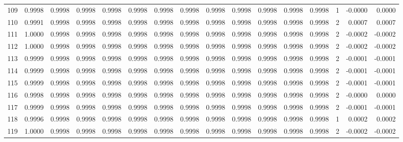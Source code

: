 \begin{tabular}{lrrrrrrrrrrrrrrr}
109 &      0.9998 &  0.9998 &  0.9998 &  0.9998 &  0.9998 &  0.9998 &  0.9998 &  0.9998 &  0.9998 &  0.9998 &   0.9998 &     0.9998 &      1 &                   -0.0000 &                     0.0000 \\
110 &      0.9991 &  0.9998 &  0.9998 &  0.9998 &  0.9998 &  0.9998 &  0.9998 &  0.9998 &  0.9998 &  0.9998 &   0.9998 &     0.9998 &      2 &                    0.0007 &                     0.0007 \\
111 &      1.0000 &  0.9998 &  0.9998 &  0.9998 &  0.9998 &  0.9998 &  0.9998 &  0.9998 &  0.9998 &  0.9998 &   0.9998 &     0.9998 &      2 &                   -0.0002 &                    -0.0002 \\
112 &      1.0000 &  0.9998 &  0.9998 &  0.9998 &  0.9998 &  0.9998 &  0.9998 &  0.9998 &  0.9998 &  0.9998 &   0.9998 &     0.9998 &      2 &                   -0.0002 &                    -0.0002 \\
113 &      0.9999 &  0.9998 &  0.9998 &  0.9998 &  0.9998 &  0.9998 &  0.9998 &  0.9998 &  0.9998 &  0.9998 &   0.9998 &     0.9998 &      2 &                   -0.0001 &                    -0.0001 \\
114 &      0.9999 &  0.9998 &  0.9998 &  0.9998 &  0.9998 &  0.9998 &  0.9998 &  0.9998 &  0.9998 &  0.9998 &   0.9998 &     0.9998 &      2 &                   -0.0001 &                    -0.0001 \\
115 &      0.9999 &  0.9998 &  0.9998 &  0.9998 &  0.9998 &  0.9998 &  0.9998 &  0.9998 &  0.9998 &  0.9998 &   0.9998 &     0.9998 &      2 &                   -0.0001 &                    -0.0001 \\
116 &      0.9998 &  0.9998 &  0.9998 &  0.9998 &  0.9998 &  0.9998 &  0.9998 &  0.9998 &  0.9998 &  0.9998 &   0.9998 &     0.9998 &      2 &                   -0.0000 &                     0.0000 \\
117 &      0.9999 &  0.9998 &  0.9998 &  0.9998 &  0.9998 &  0.9998 &  0.9998 &  0.9998 &  0.9998 &  0.9998 &   0.9998 &     0.9998 &      2 &                   -0.0001 &                    -0.0001 \\
118 &      0.9996 &  0.9998 &  0.9998 &  0.9998 &  0.9998 &  0.9998 &  0.9998 &  0.9998 &  0.9998 &  0.9998 &   0.9998 &     0.9998 &      1 &                    0.0002 &                     0.0002 \\
119 &      1.0000 &  0.9998 &  0.9998 &  0.9998 &  0.9998 &  0.9998 &  0.9998 &  0.9998 &  0.9998 &  0.9998 &   0.9998 &     0.9998 &      2 &                   -0.0002 &                    -0.0002 \\

\end{tabular}
